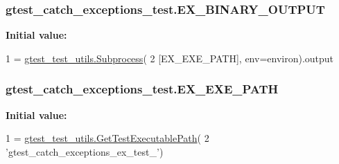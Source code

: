 \subsubsection[{\texorpdfstring{E\+X\+\_\+\+B\+I\+N\+A\+R\+Y\+\_\+\+O\+U\+T\+P\+UT}{EX_BINARY_OUTPUT}}]{\setlength{\rightskip}{0pt plus 5cm}gtest\+\_\+catch\+\_\+exceptions\+\_\+test.\+E\+X\+\_\+\+B\+I\+N\+A\+R\+Y\+\_\+\+O\+U\+T\+P\+UT}\hypertarget{namespacegtest__catch__exceptions__test_a012f2b0e05fd56aa6817595da940c891}{}\label{namespacegtest__catch__exceptions__test_a012f2b0e05fd56aa6817595da940c891}
{\bfseries Initial value\+:}
\begin{DoxyCode}
1 = \hyperlink{classgtest__test__utils_1_1Subprocess}{gtest\_test\_utils.Subprocess}(
2     [EX\_EXE\_PATH], env=environ).output
\end{DoxyCode}
\subsubsection[{\texorpdfstring{E\+X\+\_\+\+E\+X\+E\+\_\+\+P\+A\+TH}{EX_EXE_PATH}}]{\setlength{\rightskip}{0pt plus 5cm}gtest\+\_\+catch\+\_\+exceptions\+\_\+test.\+E\+X\+\_\+\+E\+X\+E\+\_\+\+P\+A\+TH}\hypertarget{namespacegtest__catch__exceptions__test_a2154a0f0c4c506089d686c1365d288be}{}\label{namespacegtest__catch__exceptions__test_a2154a0f0c4c506089d686c1365d288be}
{\bfseries Initial value\+:}
\begin{DoxyCode}
1 = \hyperlink{namespacegtest__test__utils_a89ed3717984a80ffbb7a9c92f71b86a2}{gtest\_test\_utils.GetTestExecutablePath}(
2     \textcolor{stringliteral}{'gtest\_catch\_exceptions\_ex\_test\_'})
\end{DoxyCode}
